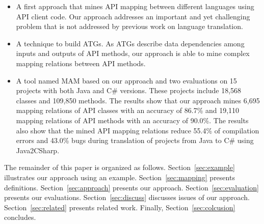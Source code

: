 \begin{itemize}\vspace*{-1.5ex}
\item A first approach that mines API mapping between
different languages using API client code. Our
approach addresses an important and yet challenging problem that is not
addressed by previous work on language translation.\vspace*{-1.5ex}
\item A technique to build ATGs. As ATGs describe data dependencies among
inputs and outputs of API methods, our approach is able to mine
complex mapping relations between API methods.\vspace*{-1.5ex}
\item A tool named MAM based on our approach and two
evaluations on 15 projects with both Java and C\# versions. These
projects include 18,568 classes and 109,850 methods. The results
show that our approach mines 6,695 mapping relations of API classes
with an accuracy of 86.7\% and 19,110 mapping relations of API
methods with an accuracy of 90.0\%. The results also show that the
mined API mapping relations reduce 55.4\% of compilation errors and
43.0\% bugs during translation of projects from Java to C\# using
Java2CSharp.
\end{itemize}\vspace*{-1.5ex}

The remainder of this paper is organized as follows. Section~\ref{sec:example}
illustrates our approach using an example. Section~\ref{sec:mapping}
presents definitions. Section~\ref{sec:approach} presents our
approach. Section~\ref{sec:evaluation} presents our evaluations.
Section~\ref{sec:discuss} discusses issues of our approach.
Section~\ref{sec:related} presents related work. Finally,
Section~\ref{sec:colcusion} concludes.
